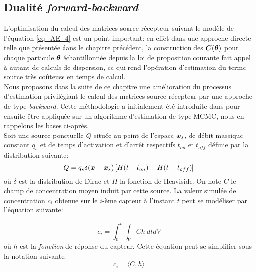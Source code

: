 \subsection{Dualité \textit{forward-backward}}

L'optimisation du calcul des matrices source-récepteur suivant le modèle de l'équation \eqref{eq_AE_4} est un point important: en effet dans une approche directe telle que présentée dans le chapitre précédent, la construction des ${\bm{C}}({\bm{\theta}})$ pour chaque particule ${\bm{\theta}}$ échantillonnée depuis la loi de proposition courante fait appel à autant de calculs de dispersion, ce qui rend l'opération d'estimation du terme source très coûteuse en temps de calcul.\\

Nous proposons dans la suite de ce chapitre une amélioration du processus d'estimation privilégiant le calcul des matrices source-récepteur par une approche de type \textit{backward}. Cette méthodologie a initialement été introduite dans \cite{Keats2007} pour ensuite être appliquée sur un algorithme d'estimation de type MCMC, nous en rappelons les bases ci-après.\\

Soit une source ponctuelle $Q$ située au point de l'espace ${\bm{x}_s}$, de débit massique constant $q_s$ et de temps d'activation et d'arrêt respectifs $t_{on}$ et $t_{off}$ définie par la distribution suivante:\\

\begin{equation}
	Q = q_s \delta({\bm{x}} - {\bm{x}_s})\left[H(t - t_{on}) - H(t - t_{off})\right]
\end{equation}
où $\delta$ est la distribution de Dirac et $H$ la fonction de Heaviside. On note $C$ le champ de concentration moyen induit par cette  source. La valeur simulée de concentration $c_i$ obtenue sur le $i$-ème capteur à l'instant $t$ peut se modéliser par l'équation suivante:

\begin{equation}
c_i = \int_0^t \int_V C h ~dtdV
\label{eq_int_direct}
\end{equation}
où $h$ est la \textit{fonction} de réponse du capteur. Cette équation peut se simplifier sous la notation suivante:\\

\begin{equation}
c_i = \langle	C,h\rangle
\label{eq_scal_direct}
\end{equation} 

